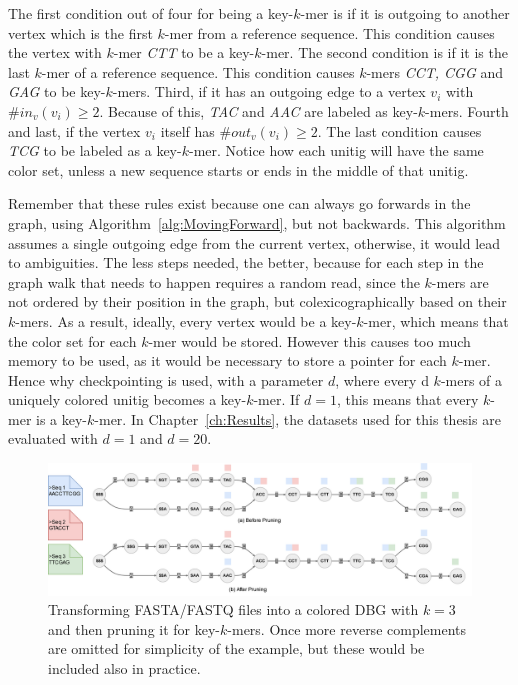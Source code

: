 The first condition out of four for being a key-$k$-mer is if it is outgoing to another vertex which is the first $k$-mer from a reference sequence.
This condition causes the vertex with $k$-mer \textit{CTT} to be a key-$k$-mer.
The second condition is if it is the last $k$-mer of a reference sequence.
This condition causes $k$-mers \textit{CCT, CGG} and \textit{GAG} to be key-$k$-mers.
Third, if it has an outgoing edge to a vertex $v_i$ with $\#in_v(v_i) \ge 2$.
Because of this, \textit{TAC} and \textit{AAC} are labeled as key-$k$-mers.
Fourth and last, if the vertex $v_i$ itself has $\#out_v(v_i) \ge 2$.
The last condition causes \textit{TCG} to be labeled as a key-$k$-mer.
Notice how each unitig will have the same color set, unless a new sequence starts or ends in the middle of that unitig.

Remember that these rules exist because one can always go forwards in the graph, using Algorithm~\ref{alg:MovingForward}, but not backwards.
This algorithm assumes a single outgoing edge from the current vertex, otherwise, it would lead to ambiguities.
The less steps needed, the better, because for each step in the graph walk that needs to happen requires a random read, since the $k$-mers are not ordered by their position in the graph, but colexicographically based on their $k$-mers.
As a result, ideally, every vertex would be a key-$k$-mer, which means that the color set for each $k$-mer would be stored.
However this causes too much memory to be used, as it would be necessary to store a pointer for each $k$-mer.
Hence why checkpointing is used, with a parameter $d$, where every d $k$-mers of a uniquely colored unitig becomes a key-$k$-mer.
If $d=1$, this means that every $k$-mer is a key-$k$-mer.
In Chapter~\ref{ch:Results}, the datasets used for this thesis are evaluated with $d=1$ and $d=20$.

\begin{figure}[t]
  \centering
  \includegraphics[width=\textwidth]{images/KeyKmers.png}
  \caption{Transforming FASTA/FASTQ files into a colored DBG with $k=3$ and then pruning it for key-$k$-mers. Once more reverse complements are omitted for simplicity of the example, but these would be included also in practice.}\label{fig:KeyKmers}
\end{figure}

